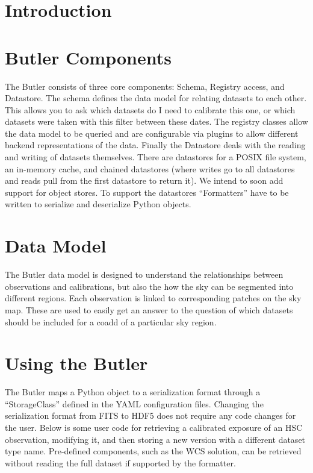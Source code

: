 \documentclass[11pt,twoside]{article}
\begin{document}
\section{Introduction}

\section{Butler Components}

The Butler consists of  three core components: Schema, Registry access, and Datastore.
The schema defines the data model for relating datasets to each other.
This allows you to ask which datasets do I need to calibrate this one, or which datasets were taken with this filter between these dates.
The registry classes allow the data model to be queried and are configurable via plugins to allow different backend representations of the data.
Finally the Datastore deals with the reading and writing of datasets themselves.
There are datastores for a POSIX file system, an in-memory cache, and chained datastores (where writes go to all datastores and reads pull from the first datastore to return it).
We intend to soon add support for object stores.
To support the datastores ``Formatters'' have to be written to serialize and deserialize Python objects.

\section{Data Model}

The Butler  data model is designed to understand the relationships between observations and calibrations, but also the how the sky can be segmented into different regions.
Each observation is linked to corresponding patches on the sky map.
These are used to easily get an answer to the question of which datasets should be included for a coadd of a particular sky region.

\section{Using the Butler}

The Butler maps a Python object to a serialization format through a ``StorageClass'' defined in the YAML configuration files.
Changing the serialization format from FITS to HDF5 does not require any code changes for the user.
Below is some user code for retrieving a calibrated exposure of an HSC observation, modifying it, and then storing a new version with a different dataset type name.
Pre-defined components, such as the WCS solution, can be retrieved without reading the full dataset if supported by the formatter.
\end{document}
